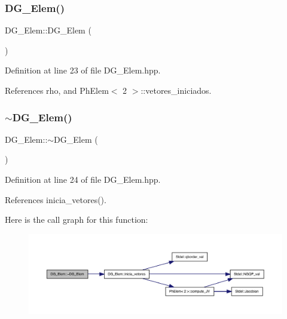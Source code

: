 \subsubsection{\texorpdfstring{D\+G\+\_\+\+Elem()}{DG\_Elem()}}
{\footnotesize\ttfamily D\+G\+\_\+\+Elem\+::\+D\+G\+\_\+\+Elem (\begin{DoxyParamCaption}{ }\end{DoxyParamCaption})\hspace{0.3cm}{\ttfamily [inline]}}



Definition at line 23 of file D\+G\+\_\+\+Elem.\+hpp.



References rho, and Ph\+Elem$<$ 2 $>$\+::vetores\+\_\+iniciados.

\mbox{\label{classDG__Elem_af37ff3dd87674abfdd621f8cdba43975}} 
\subsubsection{\texorpdfstring{$\sim$\+D\+G\+\_\+\+Elem()}{~DG\_Elem()}}
{\footnotesize\ttfamily D\+G\+\_\+\+Elem\+::$\sim$\+D\+G\+\_\+\+Elem (\begin{DoxyParamCaption}{ }\end{DoxyParamCaption})\hspace{0.3cm}{\ttfamily [inline]}}



Definition at line 24 of file D\+G\+\_\+\+Elem.\+hpp.



References inicia\+\_\+vetores().

Here is the call graph for this function\+:
\nopagebreak
\begin{figure}[H]
\begin{center}
\leavevmode
\includegraphics[width=350pt]{classDG__Elem_af37ff3dd87674abfdd621f8cdba43975_cgraph}
\end{center}
\end{figure}


